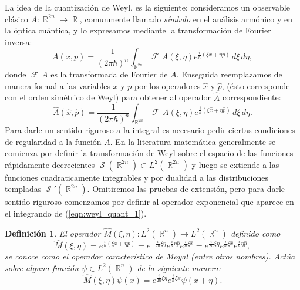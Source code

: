 \documentclass[a4paper]{report}
\DeclareMathOperator{\R}{\mathbb{R}}
\DeclareMathOperator{\Sz}{\mathcal S}
\DeclareMathOperator{\Fr}{\mathcal{F}\!}
\newtheorem{definition}{Definición}
\begin{document}
  La idea de la cuantización de Weyl, es la siguiente:
  consideramos un observable clásico $A : \R^{2n} \to \R$,
  comunmente llamado \textit{símbolo} en el análisis
  armónico y en la óptica cuántica, y lo expresamos mediante
  la transformación de Fourier inversa:
  \begin{equation}
    A(x,p)
    = \frac{1}{(2\pi\hbar)^{n}} \int_{\R^{2n}} \Fr A(\xi,
    \eta) e^{\frac{i}{\hbar} \left( \xi x + \eta p\right) }
    \, d\xi \, d\eta,
  \end{equation}
  donde $\Fr A$ es la transformada de Fourier de $A$.
  Enseguida reemplazamos de manera formal a las variables
  $x$ y $p$ por los operadores $\hat{x}$ y $\hat{p}$, (ésto
  corresponde con el orden simétrico de Weyl) para obtener
  al operador $\hat{A}$ correspondiente:
  \begin{equation}
    \label{eqn:weyl_quant_1}
    \hat{A}(\hat{x},\hat{p})
    = \frac{1}{(2\pi\hbar)^{n}} \int_{\R^{2n}} \Fr
    A(\xi,\eta) e^{\frac{i}{\hbar} \left( \xi \hat{x} + \eta
    \hat{p}\right) } \, d\xi \, d\eta.
  \end{equation}
  Para darle un sentido riguroso a la integral es necesario
  pedir ciertas condiciones de regularidad a la función $A$.
  En la literatura matemática generalmente se comienza por
  definir la transformación de Weyl sobre el espacio de las
  funciones rápidamente decrecientes $\Sz(\R^{2n}) \subset
  L^2(\R^{2n})$ y luego se extiende a las funciones
  cuadraticamente integrables y por dualidad a las
  distribuciones templadas $\Sz'(\R^{2n})$. Omitiremos las
  pruebas de extensión, pero para darle sentido riguroso
  comenzamos por definir al operador exponencial que aparece
  en el integrando de (\ref{eqn:weyl_quant_1}).
  \begin{definition}
    El operador $\hat{M}(\xi, \eta) : L^2(\R^{n}) \to
    L^2(\R^{n})$ definido como
    \begin{equation*}
      \hat{M}(\xi,\eta)
      = e^{\frac{i}{\hbar} \left( \xi \hat{x} + \eta \hat{p}
      \right) }
      = e^{-\frac{i}{2\hbar} \xi \eta} e^{\frac{i}{\hbar}
      \eta \hat{p}} e^{\frac{i}{\hbar} \xi \hat{x}}
      = e^{\frac{i}{2\hbar} \xi \eta} e^{\frac{i}{\hbar}
      \xi \hat{x}} e^{\frac{i}{\hbar} \eta \hat{p}},
    \end{equation*} 
    se conoce como el operador característico de Moyal
    (entre otros nombres). Actúa sobre alguna función $\psi
    \in L^2(\R^{n})$ de la siguiente manera:
    \begin{equation}
      \hat{M}(\xi,\eta)\psi(x)
      = e^{\frac{i}{2\hbar} \xi\eta} e^{\frac{i}{\hbar} \xi
      x} \psi(x + \eta).
    \end{equation}
  \end{definition}
\end{document}
